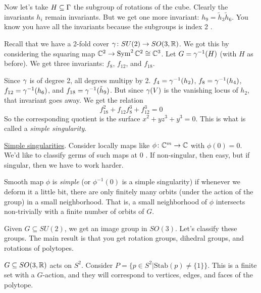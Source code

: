 \begin{example}
 Now let's take $H\subseteq \Gamma$ the subgroup of rotations of the cube. Clearly the invariants $h_i$ remain invariants. But we get one more invariant: $h_9=\tilde h_3\tilde h_6$. You know you have all the invariants because the subgroups is index 2 .
\end{example}
\begin{example}
 Recall that we have a 2-fold cover $\gamma\colon SU(2)\to SO(3,\mathbb{R})$. We got this by considering the squaring map $\mathbb{C}^2\to \operatorname{Sym}^2\mathbb{C}^2\cong \mathbb{C}^3$. Let $G=\gamma^{-1}(H)$ (with $H$ as before). We get three invariants: $f_8$, $f_{12}$, and $f_{18}$.
 
 Since $\gamma$ is of degree 2, all degrees multipy by 2. $f_4=\gamma^{-1}(h_2)$, $f_8=\gamma^{-1}(h_4)$, $f_{12}=\gamma^{-1}(h_6)$, and $f_{18}=\gamma^{-1}(\tilde h_9)$. But since $\gamma(V)$ is the vanishing locus of $h_2$, that invariant goes away. We get the relation
 \[
  f_{18}^2+f_{12}f_8^3+f_{12}^3=0
 \]
 So the corresponding quotient is the surface $x^2+yz^3+y^3=0$. This is what is called a \emph{simple singularity}.
\end{example}
\underline{Simple singularities}. Consider locally maps like $\phi\colon \mathbb{C}^m\to \mathbb{C}$ with $\phi(0)=0$. We'd like to classify germs of such maps at $0$ . If non-singular, then easy, but if singular, then we have to work harder.

Smooth map $\phi$ is \emph{simple} (or $\phi^{-1}(0)$ is a simple singularity) if whenever we deform it a little bit, there are only finitely many orbits (under the action of the group) in a small neighborhood. That is, a small neighborhood of $\phi$ intersects non-trivially with a finite number of orbits of $G$. 


Given $G\subseteq SU(2)$, we get an image group in $SO(3)$. Let's classify these groups. The main result is that you get rotation groups, dihedral groups, and rotations of polytopes.

$G\subseteq SO(3,\mathbb{R})$ acts on $S^2$. Consider $P=\{p\in S^2|\mathrm{Stab}(p)\neq \{1\}\}$. This is a finite set with a $G$-action, and they will correspond to vertices, edges, and faces of the polytope.

